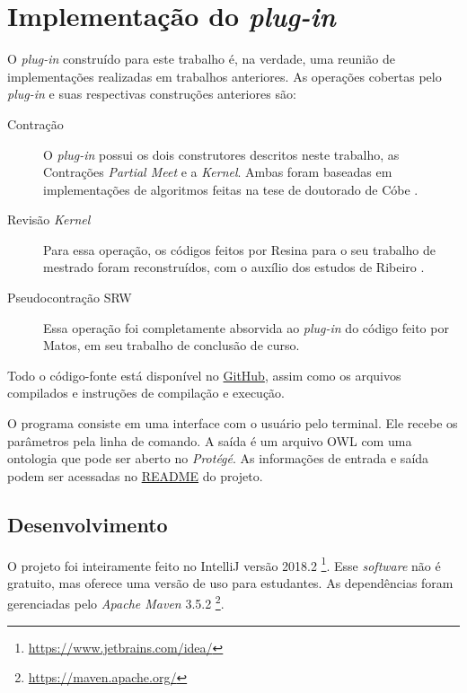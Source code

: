 \chapter{Implementação do \textit{plug-in}}
\label{chap:implementacao}

\lettrine{O}{} \textit{plug-in} construído para este trabalho é, na verdade, uma reunião de implementações realizadas em trabalhos anteriores. As operações cobertas pelo \textit{plug-in} e suas respectivas construções anteriores são:

\begin{description}
	\item[Contração] O \textit{plug-in} possui os dois construtores descritos neste trabalho, as Contrações \textit{Partial Meet} e a \textit{Kernel}. Ambas foram baseadas em implementações de algoritmos feitas na tese de doutorado de Cóbe  \citep{revisaoCobe}.
	\item[Revisão \textit{Kernel}] Para essa operação, os códigos feitos por Resina para o seu trabalho de mestrado \citep{logicaResina} foram reconstruídos, com o auxílio dos estudos de Ribeiro \citep{revisaoRibeiro2}. 
	\item[Pseudocontração SRW] Essa operação foi completamente absorvida ao \textit{plug-in} do código feito por Matos, em seu trabalho de conclusão de curso. \citep{logicaMatos}
\end{description} 

Todo o código-fonte está disponível no \href{https://github.com/lsflp/ontology-repair/}{GitHub}, assim como os arquivos
compilados e instruções de compilação e execução.

O programa consiste em uma interface com o usuário pelo terminal. Ele recebe os parâmetros pela linha de comando. A saída é um arquivo OWL com uma ontologia que pode ser aberto no \textit{Protégé}. As informações de entrada e saída podem ser acessadas no \href{https://github.com/lsflp/ontology-repair/blob/master/README.md}{README} do projeto.

\section{Desenvolvimento}

O projeto foi inteiramente feito no IntelliJ versão 2018.2 \footnote{\url{https://www.jetbrains.com/idea/}}. Esse \textit{software} não é gratuito, mas oferece uma versão de uso para estudantes. As dependências foram gerenciadas pelo \textit{Apache Maven} 3.5.2 \footnote{\url{https://maven.apache.org/}}.

